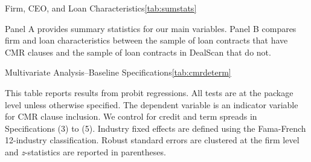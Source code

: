 \documentclass[a4paper,12pt]{article}
\begin{document}
\begin{singlespace}
\renewcommand{\tablesize}{\footnotesize}


\begin{papertable}{Firm, CEO, and Loan Characteristics}{\ref{tab:sumstats}}{} \label{tab:sumstats}

    Panel A provides summary statistics for our main variables.
    Panel B compares firm and loan characteristics between the sample of loan contracts that have CMR clauses and the sample of loan contracts in DealScan that do not.
    \postamble

    \startdata
    \def\arraystretch{1.1}
    
    \splittable
    \setlength\tabcolsep{5pt}
    
\end{papertable}


\begin{papertable}{Multivariate Analysis--Baseline Specifications}{\ref{tab:cmrdeterm}}{} \label{tab:cmrdeterm}

    This table reports results from probit regressions. All tests are at the package level unless otherwise specified. The dependent variable is an indicator variable for CMR clause inclusion.
    We control for credit and term spreads in Specifications (3) to (5).
    Industry fixed effects are defined using the Fama-French 12-industry classification.
    Robust standard errors are clustered at the firm level and \textit{z}-statistics are reported in parentheses.
    \postamble


\end{papertable}
\end{singlespace}
\end{document}
